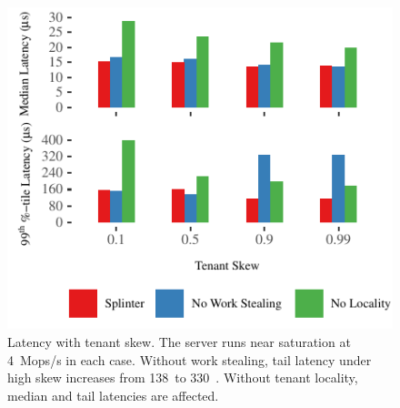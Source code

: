 \begin{figure}[t]
\centering
\includegraphics[width=1.0\columnwidth]{graphs/tenant-skew.pdf}
\caption{Latency with tenant skew. The server runs
	near saturation at 4~Mops/s in each case. Without work
	stealing, tail latency under high skew increases from 138~\us to
	330~\us. Without tenant locality, median and tail latencies
	are affected.}
\label{fig:tenant-skew}
\end{figure}
